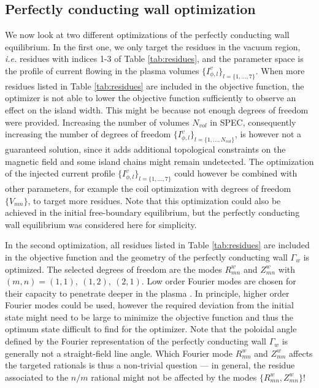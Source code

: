 \documentclass[my_thesis.tex]{subfiles}
\begin{document}
\subsection{Perfectly conducting wall optimization}

 We now look at two different optimizations of the perfectly conducting wall equilibrium. In the first one, we only target the residues in the vacuum region, \textit{i.e.} residues with indices 1-3 of Table \ref{tab:residues}, and the parameter space is the profile of current flowing in the plasma volumes $\{I^v_{\phi,l}\}_{l=\{1,\ldots,7\}}$. When more residues listed in Table \ref{tab:residues} are included in the objective function, the optimizer is not able to lower the objective function sufficiently to observe an effect on the island width. This might be because not enough degrees of freedom were provided. Increasing the number of volumes $N_{vol}$ in \ac{SPEC}, consequently increasing the number of degrees of freedom $\{I^v_{\phi,l}\}_{l=\{1,\ldots,N_{vol}\}}$, is however not a guaranteed solution, since it adds additional topological constraints on the magnetic field and some island chains might remain undetected. The optimization of the injected current profile $\{I^v_{\phi,l}\}_{l=\{1,\ldots,7\}}$ could however be combined with other parameters, for example the coil optimization with degrees of freedom $\{V_{mn}\}$, to target more residues. Note that this optimization could also be achieved in the initial free-boundary equilibrium, but the perfectly conducting wall equilibrium was considered here for simplicity.
 
 In the second optimization, all residues listed in Table \ref{tab:residues} are included in the objective function and the geometry of the perfectly conducting wall $\Gamma_w$ is optimized. The selected degrees of freedom are the modes $R^w_{mn}$ and $Z^w_{mn}$ with $(m,n)=(1,1),\ (1,2),\ (2,1)$. Low order Fourier modes are chosen for their capacity to penetrate deeper in the plasma \citep{Helander2014}. In principle, higher order Fourier modes could be used, however the required deviation from the initial state might need to be large to minimize the objective function and thus the optimum state difficult to find for the optimizer. Note that the poloidal angle defined by the Fourier representation of the perfectly conducting wall $\Gamma_w$ is generally not a straight-field line angle. Which Fourier mode $R^w_{mn}$ and $Z^w_{mn}$ affects the targeted rationals is thus a non-trivial question --- in general, the residue associated to the $n/m$ rational might not be affected by the modes $\{R^w_{mn},Z^w_{mn}\}$!
\end{document}
